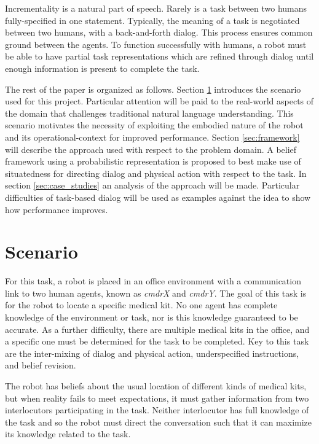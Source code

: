 \documentclass[12pt]{article}
\begin{document}
Incrementality is a natural part of speech. Rarely is a task between
two humans fully-specified in one statement. Typically, the meaning of
a task is negotiated between two humans, with a back-and-forth
dialog. This process ensures common ground between the agents. To
function successfully with humans, a robot must be able to have
partial task representations which are refined through dialog until
enough information is present to complete the task.

The rest of the paper is organized as follows. Section
\ref{sec:scenario} introduces the scenario used for this
project. Particular attention will be paid to the real-world aspects
of the domain that challenges traditional natural language
understanding. This scenario motivates the necessity of exploiting the
embodied nature of the robot and its operational-context for improved
performance. Section \ref{sec:framework} will describe the approach
used with respect to the problem domain. A belief framework using a
probabilistic representation is proposed to best make use of
situatedness for directing dialog and physical action with respect to
the task. In section \ref{sec:case_studies} an analysis of the
approach will be made. Particular difficulties of task-based dialog
will be used as examples against the idea to show how performance
improves.

\section{Scenario}
\label{sec:scenario}
For this task, a robot is placed in an office environment with a
communication link to two human agents, known as \textit{cmdrX} and
\textit{cmdrY}. The goal of this task is for the robot to locate a
specific medical kit. No one agent has complete knowledge of the
environment or task, nor is this knowledge guaranteed to be accurate.
As a further difficulty, there are multiple medical kits in the
office, and a specific one must be determined for the task to be
completed. Key to this task are the inter-mixing of dialog and
physical action, underspecified instructions, and belief revision.

The robot has beliefs about the usual location of different kinds of
medical kits, but when reality fails to meet expectations, it must
gather information from two interlocutors participating in the
task. Neither interlocutor has full knowledge of the task and so the
robot must direct the conversation such that it can maximize its
knowledge related to the task.
\end{document}
